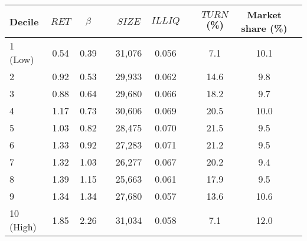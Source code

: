\begin{tabular}{@{}lccccccccc@{}}
	\toprule
	Decile & $\textit{RET}$ & $\beta$ && $\textit{SIZE}$ & $\textit{ILLIQ}$ && $\textit{TURN}$ (\%) & Market share (\%) \\ \midrule
1 (Low) & 0.54 & 0.39 && 31,076 & 0.056 && 7.1 & 10.1 \\
2       & 0.92 & 0.53 && 29,933 & 0.062 && 14.6 & 9.8 \\
3       & 0.88 & 0.64 && 29,680 & 0.066 && 18.2 & 9.7 \\
4       & 1.17 & 0.73 && 30,606 & 0.069 && 20.5 & 10.0 \\
5       & 1.03 & 0.82 && 28,475 & 0.070 && 21.5 & 9.5 \\
6       & 1.33 & 0.92 && 27,283 & 0.071 && 21.2 & 9.5 \\
7       & 1.32 & 1.03 && 26,277 & 0.067 && 20.2 & 9.4 \\
8       & 1.39 & 1.15 && 25,663 & 0.061 && 17.9 & 9.5 \\
9       & 1.34 & 1.34 && 27,680 & 0.057 && 13.6 & 10.6 \\
10 (High) & 1.85 & 2.26 && 31,034 & 0.058 && 7.1 & 12.0 \\
	\bottomrule
\end{tabular}